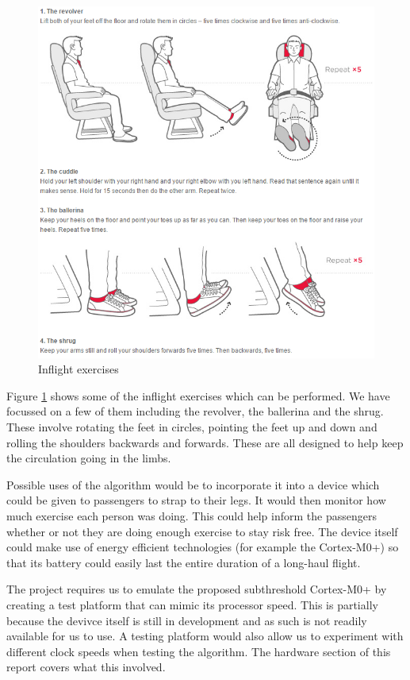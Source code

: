 \begin{figure}[h]
  \centering
    \includegraphics[width=1.0\textwidth]{figures/exercises}
  \caption{Inflight exercises \cite{virgin2015exercises}}
  \label{fig:exercises}
\end{figure}

Figure \ref{fig:exercises} shows some of the inflight exercises which can be performed. We have focussed on a few of them including the revolver, the ballerina and the shrug. These involve rotating the feet in circles, pointing the feet up and down and rolling the shoulders backwards and forwards. These are all designed to help keep the circulation going in the limbs.

Possible uses of the algorithm would be to incorporate it into a device which could be given to passengers to strap to their legs. It would then monitor how much exercise each person was doing. This could help inform the passengers whether or not they are doing enough exercise to stay risk free. The device itself could make use of energy efficient technologies (for example the Cortex-M0+) so that its battery could easily last the entire duration of a long-haul flight.

The project requires us to emulate the proposed subthreshold Cortex-M0+ by creating a test platform that can mimic its processor speed. This is partially because the devivce itself is still in development and as such is not readily available for us to use. A testing platform would also allow us to experiment with different clock speeds when testing the algorithm. The hardware section of this report covers what this involved.

